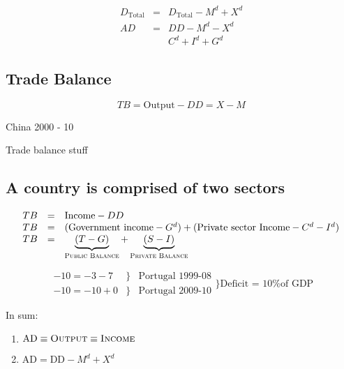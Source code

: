 \documentclass{report}
\begin{document}
\subsection{}
\begin{equation*}
\begin{array}{lcl}
D_{\text{Total}} & = & D_{\text{Total}} - M^d + X^d  \\
AD & = & DD - M^d - X^d \\ &  & C^d + I^d + G^d \end{array}
\end{equation*}
	
	\subsection{Trade Balance}
	
	$$TB=\text{Output} - DD = X - M$$
	
	China 2000 - 10
	
	Trade balance stuff
	
	\subsection{A country is comprised of two sectors}
	
	
\begin{equation*}
\begin{array}{lcl}
TB & = & \text{Income} - DD  \\
TB & = & (\text{Government income} - G^d) + (\text{Private sector Income} - C^d - I^d) \\
TB & = & \underbrace{(T - G)}_{\text{\sc Public Balance}} + \underbrace{(S - I)}_{\text{\sc Private Balance}} \end{array}
\end{equation*}

\begin{equation*}
\begin{array}{lll}
-10 = -3 - 7  & \}  & \text{Portugal 1999-08} \\
-10 = -10 + 0  & \} & \text{Portugal 2009-10}
\end{array} \Biggr\}
\text{Deficit = 10\% of GDP}
\end{equation*}

In sum: 
\begin{enumerate}
    \item $\text{AD} \equiv \text{\sc Output} \equiv \text{\sc Income}$
\item $\text{AD} = \text{DD} - M^d + X^d $
\end{enumerate}
\end{document}

